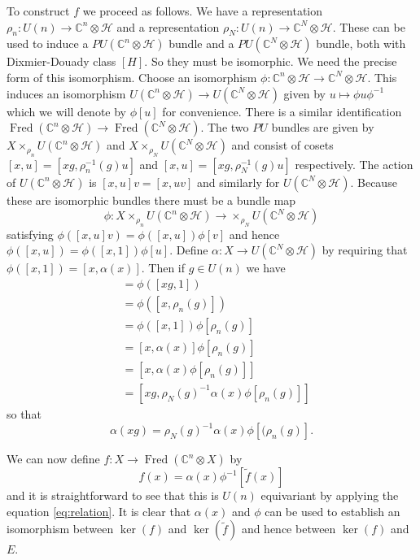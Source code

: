 \documentclass[a4paper,reqno]{amsart}
\DeclareMathOperator{\Fred}{Fred}
\theoremstyle{plain}
\theoremstyle{definition}
\theoremstyle{remark}
\numberwithin{equation}{section}
\numberwithin{figure}{section}
\newcommand{\cH}{{\mathcal H}}
\newcommand{\CC}{{\mathbb C}}
\newcommand{\<}{\langle}
\renewcommand{\>}{\rangle}
\begin{document}
To construct $f$ we proceed as follows.  We have a representation
$\rho_n \colon U(n) \to \CC^n \otimes \cH$
and a representation  $\rho_N \colon U(n) \to \CC^N \otimes \cH$.
These can be used to induce a
$PU(\CC^n \otimes \cH)$ bundle and a $PU(\CC^N \otimes \cH)$ bundle, both
with Dixmier-Douady class $[H]$.
So they must be isomorphic.  We need the precise form of this isomorphism.
Choose an isomorphism $\phi \colon \CC^n \otimes \cH \to \CC^N
\otimes \cH$. This induces
an isomorphism $U(\CC^n \otimes \cH )\to U(\CC^N \otimes \cH)$ given
by $u \mapsto
\phi u \phi^{-1}$ which we will denote by $\phi[u]$ for convenience.
There is a similar
identification $\Fred(\CC^n \otimes \cH) \to \Fred(\CC^N \otimes \cH)$. The two
$PU$ bundles are given by $X \times_{\rho_n} U(\CC^n \otimes \cH)$
and $X \times_{\rho_N} U(\CC^N \otimes \cH)$
and consist of cosets  $[x, u] = [xg, \rho^{-1}_n(g)u]$ and $[x, u] =
[xg, \rho^{-1}_N(g)u]$
respectively. The action of
$U(\CC^n \otimes \cH)$ is $[x, u]v = [x, uv]$ and similarly for
$U(\CC^N \otimes \cH)$. Because these
are isomorphic bundles there must be a bundle map
$$
\phi \colon X \times_{\rho_n} U(\CC^n \otimes \cH) \to
\times_{\rho_N} U(\CC^N \otimes \cH)
$$
satisfying $\phi([x,u]v) = \phi([x, u]) \phi[v]$ and hence
$\phi([x,u]) = \phi([x, 1]) \phi[u]$.
Define $\alpha \colon X \to U(\CC^N \otimes \cH)$ by requiring that
$\phi([x, 1]) =
[x, \alpha(x)]$. Then if $g \in U(n)$ we have
\begin{align*}
[xg, \alpha(xg)] &= \phi([xg, 1])\\
& = \phi([x, \rho_n(g)]) \\
&= \phi([x, 1])\phi[\rho_n(g)] \\
&= [x, \alpha(x)]\phi[\rho_n(g)] \\
&= [x, \alpha(x)\phi[\rho_n(g)]] \\
&= [xg, \rho_N(g)^{-1} \alpha(x) \phi[\rho_n(g)]]
\end{align*}
so that
\begin{equation}
\label{eq:relation}
\alpha(xg) = \rho_N(g)^{-1} \alpha(x) \phi[(\rho_n(g)].
\end{equation}

We can now define $ f \colon X \to \Fred(\CC^n \otimes X)$ by
$$
f(x)  =     \alpha(x)\phi^{-1}[ \tilde f(x) ]
$$
and it is straightforward to see that this is $U(n)$ equivariant
by applying the equation \eqref{eq:relation}.  It is clear that
$\alpha(x)$ and $\phi$ can be used to
establish an isomorphism between $\ker(f)$
and $\ker(\tilde f)$ and hence between $\ker(f) $ and $E$.
\end{document}
